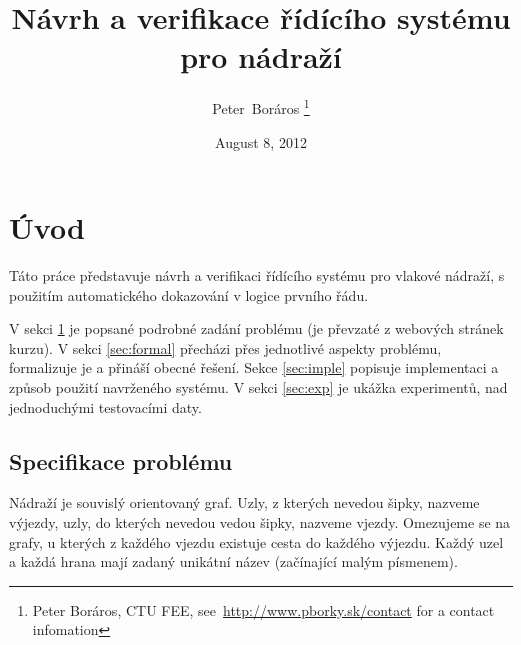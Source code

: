 \documentclass[a4paper,journal]{IEEEtran}
\begin{document}
\title{Návrh a verifikace řídícího systému pro nádraží}
\date{August 8, 2012}
\author{Peter~Boráros %
\thanks{{Peter Boráros}, CTU FEE,
see~\url{http://www.pborky.sk/contact} for a contact infomation}}%



\maketitle
\IEEEdisplaynotcompsoctitleabstractindextext
\IEEEpeerreviewmaketitle

\section{Úvod}\label{sec:intro}
Táto práce představuje návrh a verifikaci řídícího systému pro vlakové nádraží, s použitím automatického
dokazování v logice prvního řádu.

V sekci \ref{sec:intro} je popsané podrobné zadání problému (je převzaté z webových stránek kurzu). 
V sekci \ref{sec:formal} přecházi přes jednotlivé aspekty problému, formalizuje je a přináší obecné řešení. 
Sekce \ref{sec:imple} popisuje implementaci a způsob použití navrženého systému. V sekci 
\ref{sec:exp} je ukážka experimentů, nad jednoduchými testovacími daty.

\subsection{Specifikace problému}
Nádraží je souvislý orientovaný graf. Uzly, z kterých nevedou šipky, nazveme výjezdy, uzly, 
do kterých nevedou vedou šipky, nazveme vjezdy. Omezujeme se na grafy, u kterých 
z každého vjezdu existuje cesta do každého výjezdu. Každý uzel a každá hrana mají 
zadaný unikátní název (začínající malým písmenem).
\end{document}
